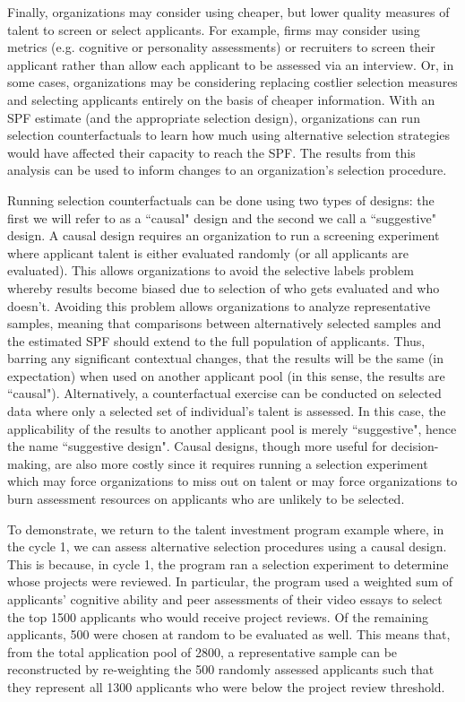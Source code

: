 Finally, organizations may consider using cheaper, but lower quality measures of talent to screen or select applicants. For example, firms may consider using metrics (e.g. cognitive or personality assessments) or recruiters to screen their applicant rather than allow each applicant to be assessed via an interview. Or, in some cases, organizations may be considering replacing costlier selection measures and selecting applicants entirely on the basis of cheaper information. With an SPF estimate (and the appropriate selection design), organizations can run selection counterfactuals to learn how much using alternative selection strategies would have affected their capacity to reach the SPF. The results from this analysis can be used to inform changes to an organization's selection procedure. 

Running selection counterfactuals can be done using two types of designs: the first we will refer to as a ``causal" design and the second we call a ``suggestive" design. A causal design requires an organization to run a screening experiment where applicant talent is either evaluated randomly (or all applicants are evaluated). This allows organizations to avoid the selective labels problem whereby results become biased due to selection of who gets evaluated and who doesn't. Avoiding this problem allows organizations to analyze representative samples, meaning that comparisons between alternatively selected samples and the estimated SPF should extend to the full population of applicants. Thus, barring any significant contextual changes, that the results will be the same (in expectation) when used on another applicant pool (in this sense, the results are ``causal"). Alternatively, a counterfactual exercise can be conducted on selected data where only a selected set of individual's talent is assessed. In this case, the applicability of the results to another applicant pool is merely ``suggestive", hence the name ``suggestive design". Causal designs, though more useful for decision-making, are also more costly since it requires running a selection experiment which may force organizations to miss out on talent or may force organizations to burn assessment resources on applicants who are unlikely to be selected. 

To demonstrate, we return to the talent investment program example where, in the cycle 1, we can assess alternative selection procedures using a causal design. This is because, in cycle 1, the program ran a selection experiment to determine whose projects were reviewed. In particular, the program used a weighted sum of applicants' cognitive ability and peer assessments of their video essays to select the top 1500 applicants who would receive project reviews. Of the remaining applicants, 500 were chosen at random to be evaluated as well. This means that, from the total application pool of 2800, a representative sample can be reconstructed by re-weighting the 500 randomly assessed applicants such that they represent all 1300 applicants who were below the project review threshold.

